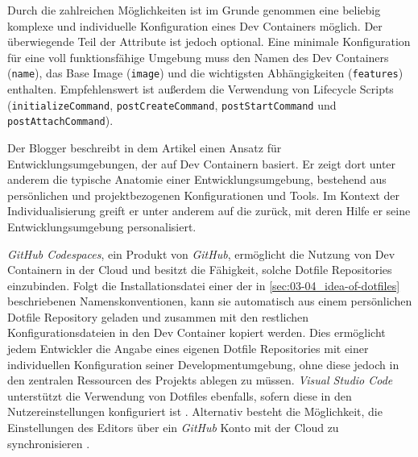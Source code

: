 Durch die zahlreichen Möglichkeiten ist im Grunde genommen eine beliebig komplexe und individuelle Konfiguration eines Dev Containers möglich. Der überwiegende Teil der Attribute ist jedoch optional. Eine minimale Konfiguration für eine voll funktionsfähige Umgebung muss den Namen des Dev Containers (\texttt{name}), das Base Image (\texttt{image}) und die wichtigsten Abhängigkeiten (\texttt{features}) enthalten. Empfehlenswert ist außerdem die Verwendung von Lifecycle Scripts (\texttt{initializeCommand}, \texttt{postCreateCommand}, \texttt{postStartCommand} und \texttt{postAttachCommand}). \cite{204:Development-Containers-Simplified}

Der Blogger \citeauthor{203:Dev-Environment-as-a-Code-with-DevContainers-Dotfiles-and-GitHub-Codespaces} beschreibt in dem Artikel  einen Ansatz für Entwicklungsumgebungen, der auf Dev Containern basiert. Er zeigt dort unter anderem die typische Anatomie einer Entwicklungsumgebung, bestehend aus persönlichen und projektbezogenen Konfigurationen und Tools. Im Kontext der Individualisierung greift er unter anderem auf die  zurück, mit deren Hilfe er seine Entwicklungsumgebung personalisiert. \cite{203:Dev-Environment-as-a-Code-with-DevContainers-Dotfiles-and-GitHub-Codespaces}

\textit{GitHub Codespaces}, ein Produkt von \textit{GitHub}, ermöglicht die Nutzung von Dev Containern in der Cloud und besitzt die Fähigkeit, solche Dotfile Repositories einzubinden. Folgt die Installationsdatei einer der in \autoref{sec:03-04_idea-of-dotfiles} beschriebenen Namenskonventionen, kann sie automatisch aus einem persönlichen Dotfile Repository geladen und zusammen mit den restlichen Konfigurationsdateien in den Dev Container kopiert werden. \cite{304:Personalizing-GitHub-Codespaces-for-your-Account} Dies ermöglicht jedem Entwickler die Angabe eines eigenen Dotfile Repositories mit einer individuellen Konfiguration seiner Developmentumgebung, ohne diese jedoch in den zentralen Ressourcen des Projekts ablegen zu müssen. \textit{Visual Studio Code} unterstützt die Verwendung von Dotfiles ebenfalls, sofern diese in den Nutzereinstellungen konfiguriert ist \cite{201:How-to-develop-with-Dev-Containers}. Alternativ besteht die Möglichkeit, die Einstellungen des Editors über ein \textit{GitHub} Konto mit der Cloud zu synchronisieren \cite{304:Personalizing-GitHub-Codespaces-for-your-Account}.
